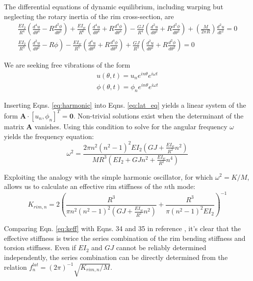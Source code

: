 \documentclass[../thesis.tex]{subfiles}
\begin{document}
The differential equations of dynamic equilibrium, including warping but neglecting the rotary inertia of the rim cross-section, are
  \begin{subequations}\label{eq:lat_eq}
  \begin{align}
  \frac{EI_{2}}{R^4}\left(\frac{d^4u}{d\theta^4}-R\frac{d^2\phi}{d\theta^2}\right) +
  \frac{EI_w}{R^6} \left(\frac{d^4u}{d\theta^4}+R\frac{d^4\phi}{d\theta^4}\right) -
  \frac{GJ}{R^4}\left(\frac{d^2u}{d\theta^2}+R\frac{d^2\phi}{d\theta^2}\right) +
  \left(\frac{M}{2\pi R}\right) \frac{d^2u}{dt^2} = 0\\
  \frac{EI_{2}}{R^3}\left(\frac{d^2u}{d\theta^2}-R\phi\right) -
  \frac{EI_w}{R^5}\left(\frac{d^4u}{d\theta^4}+R\frac{d^4\phi}{d\theta^4}\right) +
  \frac{GJ}{R^3}\left(\frac{d^2u}{d\theta^2}+R\frac{d^2\phi}{d\theta^2}\right) = 0
  \end{align}
  \end{subequations}

We are seeking free vibrations of the form
  \begin{subequations}\label{eq:harmonic}
  \begin{align}
  u(\theta, t)=u_n e^{in\theta}e^{i\omega t}\\
  \phi(\theta, t)=\phi_n e^{in\theta}e^{i\omega t}
  \end{align}
  \end{subequations}

Inserting Eqns. \ref{eq:harmonic} into Eqns. \ref{eq:lat_eq} yields a linear system of the form $\mathbf{A}\cdot [u_n, \phi_n]^T=\mathbf{0}$. Non-trivial solutions exist when the determinant of the matrix $\mathbf{A}$ vanishes. Using this condition to solve for the angular frequency $\omega$ yields the frequency equation:
  \begin{equation}\label{eq:omega}
  \omega^2 = \frac{2\pi n^2(n^2-1)^2EI_{2}\left(GJ + \frac{EI_w}{R^2}n^2 \right)}
                  {MR^3 \left( EI_{2} + GJn^2 + \frac{EI_w}{R^2}n^4\right)}
  \end{equation}

Exploiting the analogy with the simple harmonic oscillator, for which $\omega^2=K/M$, allows us to calculate an effective rim stiffness of the $n$th mode:
  \begin{equation}\label{eq:keff}
  K_{rim,n} = 2 \left( \frac{R^3}{\pi n^2(n^2-1)^2\left( GJ + \frac{EI_w}{R^2}n^2\right)} +
    \frac{R^3}{\pi(n^2-1)^2EI_{2}} \right)^{-1}
  \end{equation}

Comparing Eqn. \ref{eq:keff} with Eqns. 34 and 35 in reference \cite{Ford2016a}, it's clear that the effective stiffness is twice the series combination of the rim bending stiffness and torsion stiffness. Even if $EI_{2}$ and $GJ$ cannot be reliably determined independently, the series combination can be directly determined from the relation $f_n^{lat} = (2\pi)^{-1}\sqrt{K_{rim,n}/M}$.
\end{document}
